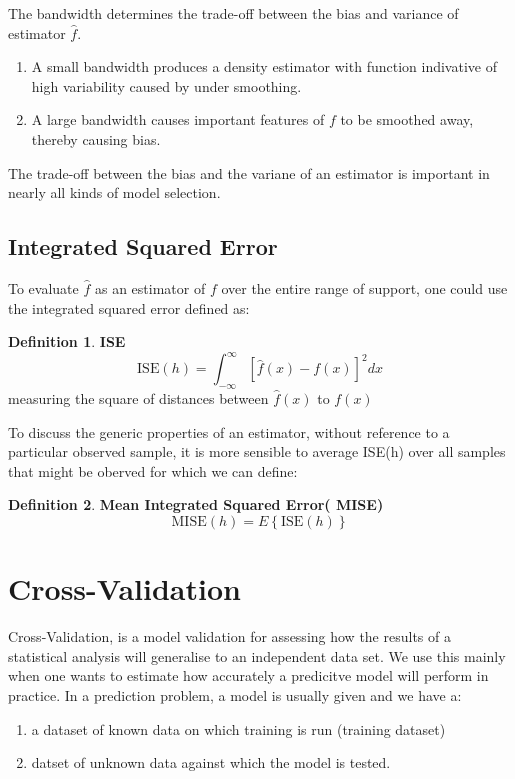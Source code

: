 \documentclass[twoside]{article}
\theoremstyle{definition}
\theoremstyle{definition}
\newtheorem*{proof1}{Definition}
\newenvironment{ddef}{\begin{dBox}\begin{proof1}}{\hfill{\scriptsize}\end{proof1}\end{dBox}}
\begin{document}
  The bandwidth determines the trade-off between the bias and variance of estimator $\hat{f}$. 
  
  \begin{enumerate}
    \item A small bandwidth produces a density estimator with function indivative of high variability caused by under smoothing. 
    \item A large bandwidth causes important features of $f$ to be smoothed away, thereby causing bias. 
  \end{enumerate}
  
  The trade-off between the bias and the variane of an estimator is important in nearly all kinds of model selection. 
  \subsection{Integrated Squared Error}
  To evaluate $\hat{f}$ as an estimator of $f$ over the entire range of support, one could use the integrated squared error defined as:
  \begin{ddef}
  \textbf{ISE}
  \begin{equation}
  \text{ISE}(h) = \int^\infty_{-\infty}\left[\hat{f}(x) - f(x)\right]^2dx
  \end{equation}
  measuring the square of distances between $\hat{f}(x)$ to $f(x)$
  \end{ddef}
  To discuss the generic properties of an estimator, without reference to a particular observed sample, it is more sensible to average ISE(h) over all samples that might be oberved for which we can define:
  \begin{ddef}
	  \textbf{Mean Integrated Squared Error( MISE)} 
	  \begin{equation}
		  \text{MISE}(h) = E\left\{ \text{ISE}(h) \right\}
	  \end{equation}
  \end{ddef}
  \section{Cross-Validation }
  Cross-Validation, is a model validation for assessing how the results of a statistical analysis will generalise to an independent data set. We use this mainly when one wants to estimate how accurately a predicitve model will perform in practice. In a prediction problem, a model is usually given and we have a:
  \begin{enumerate}
  \item a dataset of known data on which training is run (training dataset)
  \item datset of unknown data against which the model is  tested. 
  \end{enumerate}
 
\end{document}
